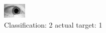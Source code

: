 \begin{figure}[h!]
\begin{center}
\includegraphics[width=0.60\columnwidth]{figures/ID1510_class_2_target_1.png}
\end{center}
\caption{ Classification: 2 actual target: 1}
\label{fig:ID1510_class_2_target_1}
\end{figure}
